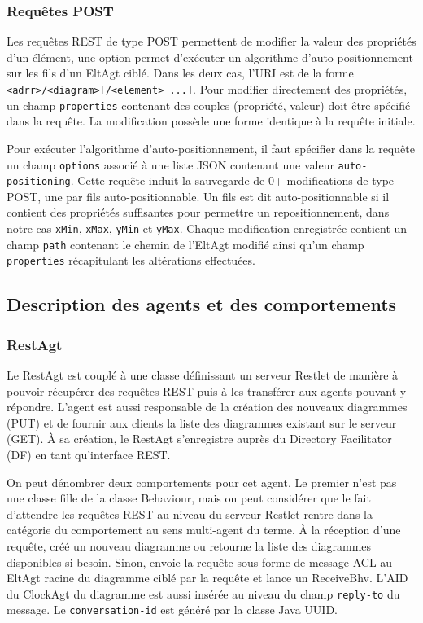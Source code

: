 \subsubsection{Requêtes POST}
Les requêtes REST de type POST permettent de modifier la valeur des propriétés d'un élément, une option permet d’exécuter un algorithme d'auto-positionnement sur les fils d'un EltAgt ciblé.
Dans les deux cas, l'URI est de la forme \lstinline$<adrr>/<diagram>[/<element> ...]$.
Pour modifier directement des propriétés, un champ \lstinline$properties$ contenant des couples (propriété, valeur) doit être spécifié dans la requête.
La modification possède une forme identique à la requête initiale.

Pour exécuter l'algorithme d'auto-positionnement, il faut spécifier dans la requête un champ \lstinline$options$ associé à une liste JSON contenant une valeur \lstinline$auto-positioning$.
Cette requête induit la sauvegarde de 0+ modifications de type POST, une par fils auto-positionnable. Un fils est dit auto-positionnable si il contient des propriétés suffisantes pour permettre un repositionnement, dans notre cas \lstinline$xMin$, \lstinline$xMax$, \lstinline$yMin$ et \lstinline$yMax$.
Chaque modification enregistrée contient un champ \lstinline$path$ contenant le chemin de l'EltAgt modifié ainsi qu'un champ \lstinline$properties$ récapitulant les altérations effectuées.

\newpage
\subsection{Description des agents et des comportements}
\subsubsection{RestAgt}
Le RestAgt est couplé à une classe définissant un serveur Restlet de manière à pouvoir récupérer des requêtes REST puis à les transférer aux agents pouvant y répondre.
L'agent est aussi responsable de la création des nouveaux diagrammes (PUT) et de fournir aux clients la liste des diagrammes existant sur le serveur (GET).
À sa création, le RestAgt s'enregistre auprès du Directory Facilitator (DF) en tant qu'interface REST.

On peut dénombrer deux comportements pour cet agent.
Le premier n'est pas une classe fille de la classe Behaviour, mais on peut considérer que le fait d'attendre les requêtes REST au niveau du serveur Restlet rentre dans la catégorie du comportement au sens multi-agent du terme.
À la réception d'une requête, créé un nouveau diagramme ou retourne la liste des diagrammes disponibles si besoin.
Sinon, envoie la requête sous forme de message ACL au EltAgt racine du diagramme ciblé par la requête et lance un ReceiveBhv.
L'AID du ClockAgt du diagramme est aussi insérée au niveau du champ \lstinline$reply-to$ du message.
Le \lstinline$conversation-id$ est généré par la classe Java UUID.

